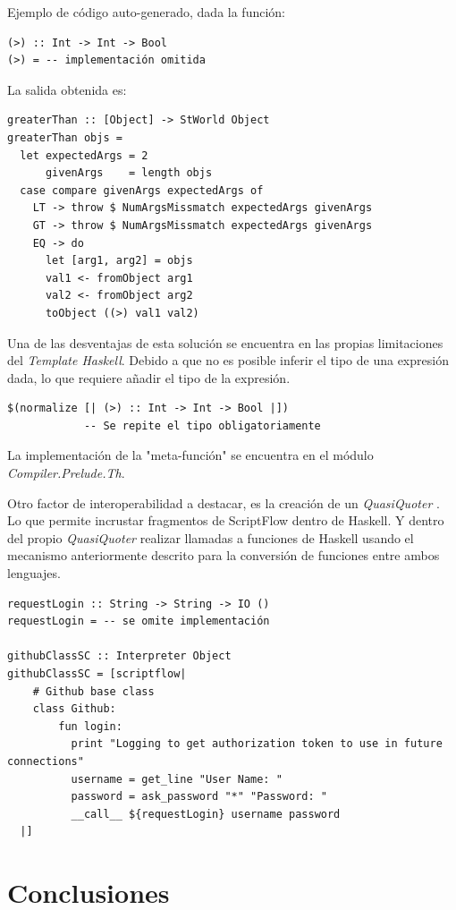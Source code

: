 \documentclass[11pt]{article}
\begin{document}
Ejemplo de código auto-generado, dada la función:
\begin{verbatim}
(>) :: Int -> Int -> Bool
(>) = -- implementación omitida
\end{verbatim}

La salida obtenida es:
\begin{verbatim}
greaterThan :: [Object] -> StWorld Object
greaterThan objs =
  let expectedArgs = 2
      givenArgs    = length objs
  case compare givenArgs expectedArgs of
    LT -> throw $ NumArgsMissmatch expectedArgs givenArgs
    GT -> throw $ NumArgsMissmatch expectedArgs givenArgs
    EQ -> do
      let [arg1, arg2] = objs
      val1 <- fromObject arg1
      val2 <- fromObject arg2
      toObject ((>) val1 val2)
\end{verbatim}

Una de las desventajas de esta solución se encuentra en las propias limitaciones del \emph{Template Haskell}. Debido a que no es posible
inferir el tipo de una expresión dada, lo que requiere añadir el tipo de la expresión.
\begin{verbatim}
$(normalize [| (>) :: Int -> Int -> Bool |])
            -- Se repite el tipo obligatoriamente
\end{verbatim}

La implementación de la "meta-función" se encuentra en el módulo \emph{Compiler.Prelude.Th}.

Otro factor de interoperabilidad a destacar, es la creación de un \emph{QuasiQuoter} \cite{quasi-quoter}. Lo que permite incrustar fragmentos de ScriptFlow
dentro de Haskell. Y dentro del propio \emph{QuasiQuoter} realizar llamadas a funciones de Haskell usando el mecanismo anteriormente descrito
para la conversión de funciones entre ambos lenguajes.

\begin{verbatim}
requestLogin :: String -> String -> IO ()
requestLogin = -- se omite implementación

githubClassSC :: Interpreter Object
githubClassSC = [scriptflow|
    # Github base class
    class Github:
        fun login:
          print "Logging to get authorization token to use in future connections"
          username = get_line "User Name: "
          password = ask_password "*" "Password: "
          __call__ ${requestLogin} username password
  |]
\end{verbatim}

\section{Conclusiones}
\label{sec:org7f52a6d}
\end{document}
